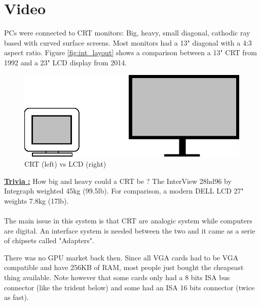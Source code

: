 \documentclass[book.tex]{subfiles}
\begin{document}
\section{Video}

PCs were connected to CRT monitors: Big, heavy, small diagonal, cathodic ray based with curved surface screens. Most monitors had a 13" diagonal with a 4:3 aspect ratio. Figure \ref{fig:int_layout} shows a comparison between a 13" CRT from 1992 and a 23" LCD display from 2014.\\

\begin{figure}[H]
\centering
\includegraphics[width=\textwidth]{imgs/crt_lcd.eps}
\caption{CRT (left) vs LCD (right)}
\label{fig:lcd_vs_crt}
\end{figure}

\textbf{\underline{Trivia :}} How big and heavy could a CRT be ? The InterView 28hd96 by Integraph weighted 45kg (99.5lb). For comparison, a modern DELL LCD 27" weights 7.8kg (17lb).\\
\\
The main issue in this system is that CRT are analogic system while computers are digital. An interface system is needed between the two and it came as a serie of chipsets called "Adapters".


 There was no GPU market back then. Since all VGA cards had to be VGA compatible and have 256KB of RAM, most people just bought the cheapeast thing available. Note however that some cards only had a 8 bits ISA bus connector (like the trident below) and some had an ISA 16 bits connector (twice as fast).\\
\par
\end{document}
